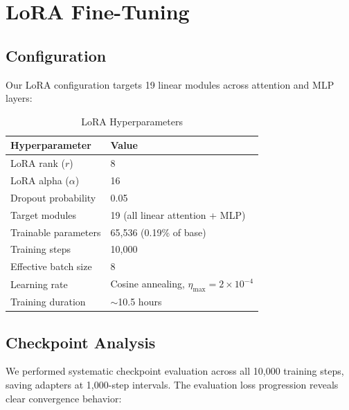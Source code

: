 \documentclass[11pt,a4paper]{article}
\theoremstyle{plain}
\theoremstyle{definition}
\begin{document}
\section{LoRA Fine-Tuning}

\subsection{Configuration}

Our LoRA configuration targets 19 linear modules across attention
and MLP layers:

\begin{table}[H]
\centering
\caption{LoRA Hyperparameters}
\begin{tabular}{ll}
\toprule
\textbf{Hyperparameter} & \textbf{Value} \\
\midrule
LoRA rank ($r$) & 8 \\
LoRA alpha ($\alpha$) & 16 \\
Dropout probability & 0.05 \\
Target modules & 19 (all linear attention + MLP) \\
Trainable parameters & 65,536 (0.19\% of base) \\
Training steps & 10,000 \\
Effective batch size & 8 \\
Learning rate & Cosine annealing, $\eta_{\max} = 2 \times 10^{-4}$ \\
Training duration & $\sim$10.5 hours \\
\bottomrule
\end{tabular}
\end{table}

\subsection{Checkpoint Analysis}

We performed systematic checkpoint evaluation across all 10,000
training steps, saving adapters at 1,000-step intervals. The
evaluation loss progression reveals clear convergence behavior:
\end{document}
